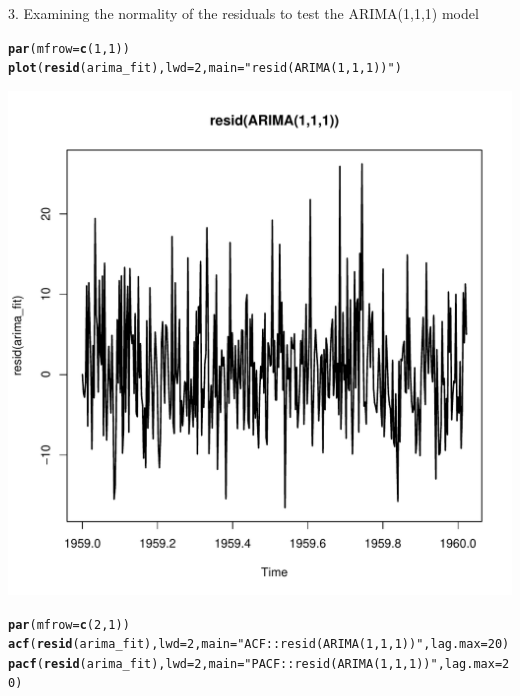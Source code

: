 \documentclass[10pt]{article}\usepackage[]{graphicx}\usepackage[]{color}
\makeatletter
\def\maxwidth{ %
  \ifdim\Gin@nat@width>\linewidth
    \linewidth
  \else
    \Gin@nat@width
  \fi
}
\newcommand{\hlnum}[1]{\textcolor[rgb]{0.686,0.059,0.569}{#1}}%
\newcommand{\hlstr}[1]{\textcolor[rgb]{0.192,0.494,0.8}{#1}}%
\newcommand{\hlstd}[1]{\textcolor[rgb]{0.345,0.345,0.345}{#1}}%
\newcommand{\hlkwc}[1]{\textcolor[rgb]{0.333,0.667,0.333}{#1}}%
\newcommand{\hlkwd}[1]{\textcolor[rgb]{0.737,0.353,0.396}{\textbf{#1}}}%
\newenvironment{kframe}{%
 \def\at@end@of@kframe{}%
 \ifinner\ifhmode%
  \def\at@end@of@kframe{\end{minipage}}%
  \begin{minipage}{\columnwidth}%
 \fi\fi%
 \def\FrameCommand##1{\hskip\@totalleftmargin \hskip-\fboxsep
 \colorbox{shadecolor}{##1}\hskip-\fboxsep
     \hskip-\linewidth \hskip-\@totalleftmargin \hskip\columnwidth}%
 \MakeFramed {\advance\hsize-\width
   \@totalleftmargin\z@ \linewidth\hsize
   \@setminipage}}%
 {\par\unskip\endMakeFramed%
 \at@end@of@kframe}
\newenvironment{knitrout}{}{} %
\makeatother
\begin{document}
3. Examining the normality of the residuals to test the ARIMA(1,1,1) model
\begin{knitrout}
\color{fgcolor}\begin{kframe}
\begin{alltt}
\hlkwd{par}\hlstd{(}\hlkwc{mfrow}\hlstd{=}\hlkwd{c}\hlstd{(}\hlnum{1}\hlstd{,}\hlnum{1}\hlstd{))}
\hlkwd{plot}\hlstd{(}\hlkwd{resid}\hlstd{(arima_fit),}\hlkwc{lwd}\hlstd{=}\hlnum{2}\hlstd{,} \hlkwc{main}\hlstd{=}\hlstr{"resid(ARIMA(1,1,1))"}\hlstd{)}
\end{alltt}
\end{kframe}
\includegraphics[width=\maxwidth]{figure/unnamed-chunk-12-1} 
\begin{kframe}\begin{alltt}
\hlkwd{par}\hlstd{(}\hlkwc{mfrow}\hlstd{=}\hlkwd{c}\hlstd{(}\hlnum{2}\hlstd{,}\hlnum{1}\hlstd{))}
\hlkwd{acf}\hlstd{(}\hlkwd{resid}\hlstd{(arima_fit),}\hlkwc{lwd}\hlstd{=}\hlnum{2}\hlstd{,} \hlkwc{main}\hlstd{=}\hlstr{"ACF::resid(ARIMA(1,1,1))"}\hlstd{,}\hlkwc{lag.max} \hlstd{=} \hlnum{20}\hlstd{)}
\hlkwd{pacf}\hlstd{(}\hlkwd{resid}\hlstd{(arima_fit),}\hlkwc{lwd}\hlstd{=}\hlnum{2}\hlstd{,} \hlkwc{main}\hlstd{=}\hlstr{"PACF::resid(ARIMA(1,1,1))"}\hlstd{,}\hlkwc{lag.max} \hlstd{=} \hlnum{20}\hlstd{)}
\end{alltt}

\end{kframe}
\end{knitrout}
\end{document}
